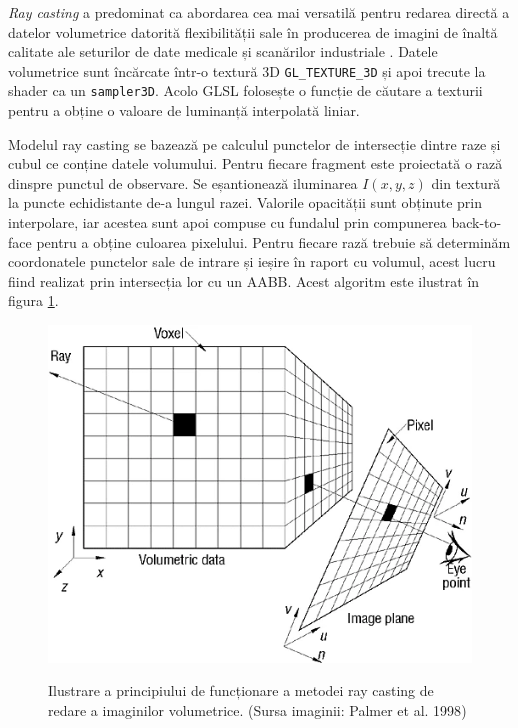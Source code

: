 \textit{Ray casting} a predominat ca abordarea cea mai versatilă pentru redarea directă a datelor volumetrice datorită flexibilității sale în producerea de imagini de înaltă calitate ale seturilor de date medicale și scanărilor industriale \cite{gpugems39}. Datele volumetrice sunt încărcate într-o textură 3D \verb|GL_TEXTURE_3D| și apoi trecute la shader ca un \verb|sampler3D|. Acolo GLSL folosește o funcție de căutare a texturii pentru a obține o valoare de luminanță interpolată liniar.

Modelul ray casting se bazează pe calculul punctelor de intersecție dintre raze și cubul ce conține datele volumului. Pentru fiecare fragment este proiectată o rază dinspre punctul de observare. Se eșantionează iluminarea $I(x,y,z)$ din textură la puncte echidistante de-a lungul razei. Valorile opacității sunt obținute prin interpolare, iar acestea sunt apoi compuse cu fundalul prin compunerea back-to-face pentru a obține culoarea pixelului. Pentru fiecare rază trebuie să determinăm coordonatele punctelor sale de intrare și ieșire în raport cu volumul, acest lucru fiind realizat prin intersecția lor cu un AABB. Acest algoritm este ilustrat în figura \ref{fig:raycasting}.

\begin{figure}[!htb]
    \centering
    \includegraphics[width=12cm]{images/raycasting.png}
    \\
    \caption{Ilustrare a principiului de funcționare a metodei ray casting de redare a imaginilor volumetrice. (Sursa imaginii: Palmer et al. 1998\cite{palmen1998})}
    \label{fig:raycasting}
\end{figure}

